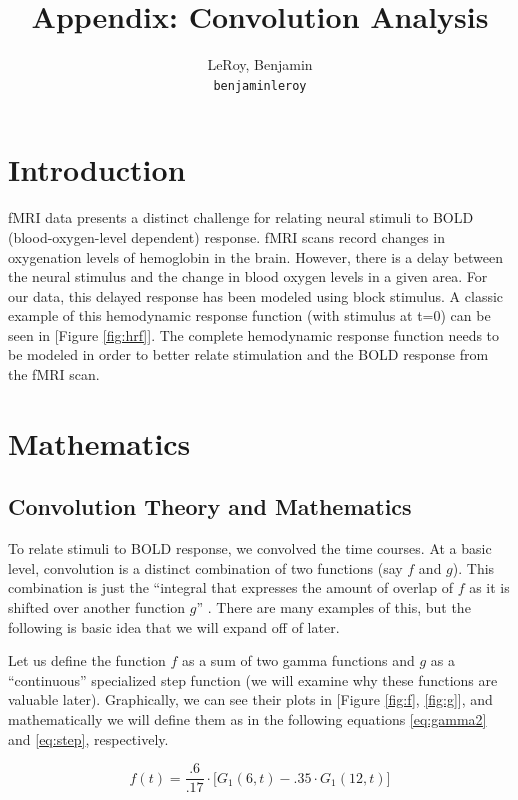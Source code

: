 \documentclass[11pt]{article}
\title{Appendix: Convolution Analysis}
\author{
  LeRoy, Benjamin\\
  \texttt{benjaminleroy}
}
\begin{document}
\maketitle


\section{Introduction}

fMRI data presents a distinct challenge for relating neural stimuli 
to BOLD (blood-oxygen-level dependent) response. fMRI scans record changes 
in oxygenation levels of hemoglobin in the brain. However, there is a delay 
between the neural stimulus and the change in blood oxygen levels in a given 
area. For our data, this delayed response has been modeled using block stimulus. 
A classic example of this hemodynamic response function (with stimulus at t=0) 
can be seen in [Figure \ref{fig:hrf}]. The complete hemodynamic response 
function needs to be modeled in order to better relate stimulation and the BOLD 
response from the fMRI scan.

\section{Mathematics}
\subsection{Convolution Theory and Mathematics}

To relate stimuli to BOLD response, we convolved the time courses. At a basic 
level, convolution is a distinct combination of two functions (say $f$ and $g$). 
This combination is just the ``integral that expresses the amount of overlap of 
$f$ as it is shifted over another function $g$'' \cite{weissten2015convolution}. 
There are many examples of this, but the following is basic idea that we will 
expand off of later. 

Let us define the function $f$ as a sum of two gamma functions and $g$ as a 
``continuous'' specialized step function (we will examine why these functions are 
valuable later). Graphically, we can see their plots in [Figure \ref{fig:f}, 
\ref{fig:g}], and mathematically we will define them as in the following 
equations \ref{eq:gamma2} and \ref{eq:step}, respectively.

\begin{equation} \label{eq:gamma2}
f(t)=\frac{.6}{.17}\cdot  \big[G_1(6,t)-.35 \cdot G_1(12,t) \big]
\end{equation}
\end{document}
